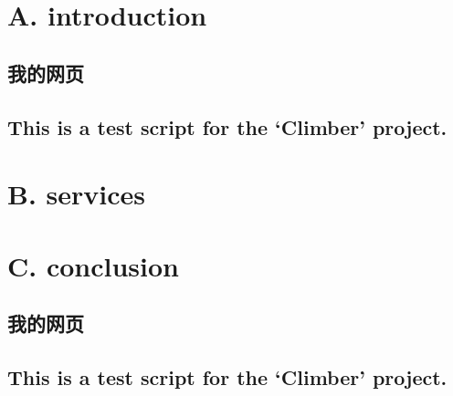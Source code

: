 \documentclass[
  letterpaper,
  DIV=11,
  numbers=noendperiod]{scrreprt}
\begin{document}
\part{A. introduction}

\chapter{}\label{section}

\chapter{我的网页}\label{ux6211ux7684ux7f51ux9875}

\chapter{This is a test script for the `Climber'
project.}\label{this-is-a-test-script-for-the-climber-project.}

\part{B. services}

\chapter{}\label{section-1}

\part{C. conclusion}

\chapter{}\label{section-2}


\chapter{我的网页}\label{ux6211ux7684ux7f51ux9875-1}


\chapter{This is a test script for the `Climber'
project.}\label{this-is-a-test-script-for-the-climber-project.-1}
\end{document}

